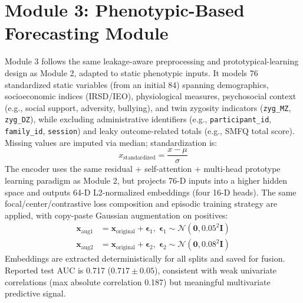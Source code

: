\documentclass[10pt,letterpaper]{article}
\begin{document}
                                                                                                                  \section*{Module 3: Phenotypic-Based Forecasting Module}
                                                                                                                  Module 3 follows the same leakage-aware preprocessing and prototypical-learning design as Module 2, adapted to static phenotypic inputs. It models 76 standardized static variables (from an initial 84) spanning demographics, socioeconomic indices (IRSD/IEO), physiological measures, psychosocial context (e.g., social support, adversity, bullying), and twin zygosity indicators (\texttt{zyg\_MZ}, \texttt{zyg\_DZ}), while excluding administrative identifiers (e.g., \texttt{participant\_id}, \texttt{family\_id}, \texttt{session}) and leaky outcome-related totals (e.g., SMFQ total score). Missing values are imputed via median; standardization is:
                                                                                                                  \begin{equation}
                                                                                                                  x_{\text{standardized}} = \frac{x - \mu}{\sigma}
                                                                                                                  \end{equation}
                                                                                                                  The encoder uses the same residual + self-attention + multi-head prototype learning paradigm as Module 2, but projects 76-D inputs into a higher hidden space and outputs 64-D L2-normalized embeddings (four 16-D heads). The same focal/center/contrastive loss composition and episodic training strategy are applied, with copy-paste Gaussian augmentation on positives:
                                                                                                                  \begin{align}
                                                                                                                  \mathbf{x}_{\text{aug1}} &= \mathbf{x}_{\text{original}} + \boldsymbol{\epsilon}_1,\;\boldsymbol{\epsilon}_1 \sim \mathcal{N}(\mathbf{0}, 0.05^2 \mathbf{I})\\
                                                                                                                  \mathbf{x}_{\text{aug2}} &= \mathbf{x}_{\text{original}} + \boldsymbol{\epsilon}_2,\;\boldsymbol{\epsilon}_2 \sim \mathcal{N}(\mathbf{0}, 0.08^2 \mathbf{I})
                                                                                                                  \end{align}
                                                                                                                  Embeddings are extracted deterministically for all splits and saved for fusion. Reported test AUC is 0.717 ($0.717\pm 0.05$), consistent with weak univariate correlations (max absolute correlation 0.187) but meaningful multivariate predictive signal.
\end{document}
